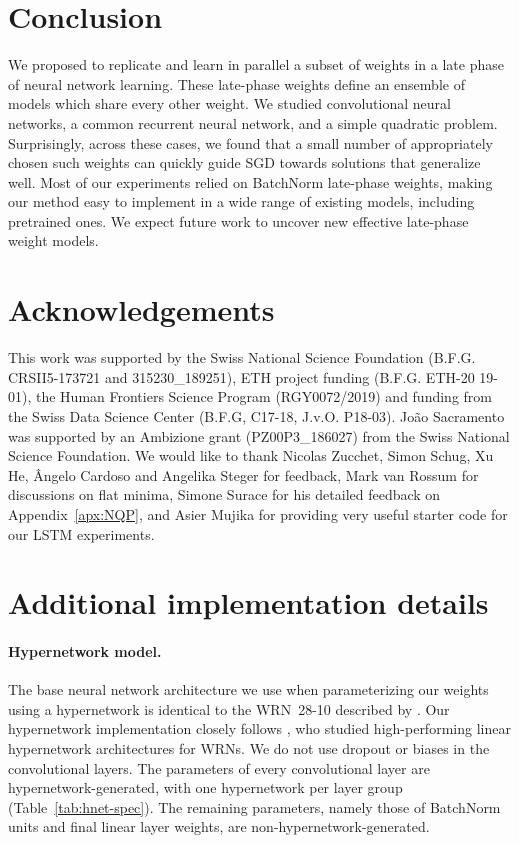 \documentclass{article} \usepackage{iclr2021_conference,times}
\begin{document}
\section{Conclusion}
We proposed to replicate and learn in parallel a subset of weights in a late phase of neural network learning. These late-phase weights define an ensemble of models which share every other weight. We studied convolutional neural networks, a common recurrent neural network, and a simple quadratic problem. Surprisingly, across these cases, we found that a small number of appropriately chosen such weights can quickly guide SGD towards solutions that generalize well. Most of our experiments relied on BatchNorm late-phase weights, making our method easy to implement in a wide range of existing models, including pretrained ones. We expect future work to uncover new effective late-phase weight models.

\section*{Acknowledgements}
This work was supported by the Swiss National Science Foundation (B.F.G. CRSII5-173721 and 315230\_189251), ETH project funding (B.F.G. ETH-20 19-01), the Human Frontiers Science Program (RGY0072/2019) and funding from the Swiss Data Science Center (B.F.G, C17-18, J.v.O. P18-03). João Sacramento was supported by an Ambizione grant (PZ00P3\_186027) from the Swiss National Science Foundation. We would like to thank Nicolas Zucchet, Simon Schug, Xu He, Ângelo Cardoso and Angelika Steger for feedback, Mark van Rossum for discussions on flat minima, Simone Surace for his detailed feedback on Appendix~\ref{apx:NQP}, and Asier Mujika for providing very useful starter code for our LSTM experiments.




\appendix
\setlength\intextsep{10pt}

\section{Additional implementation details}
\label{apx:implementation}


\paragraph{Hypernetwork model.} The base neural network architecture we use when parameterizing our weights using a hypernetwork is identical to the WRN~28-10 described by \citet{zagoruyko_wide_2016}. Our hypernetwork implementation closely follows \citet{savarese_learning_2019}, who studied high-performing linear hypernetwork architectures for WRNs. We do not use dropout or biases in the convolutional layers. The parameters of every convolutional layer are hypernetwork-generated, with one hypernetwork per layer group (Table~\ref{tab:hnet-spec}). The remaining parameters, namely those of BatchNorm units and final linear layer weights, are non-hypernetwork-generated.
\end{document}
